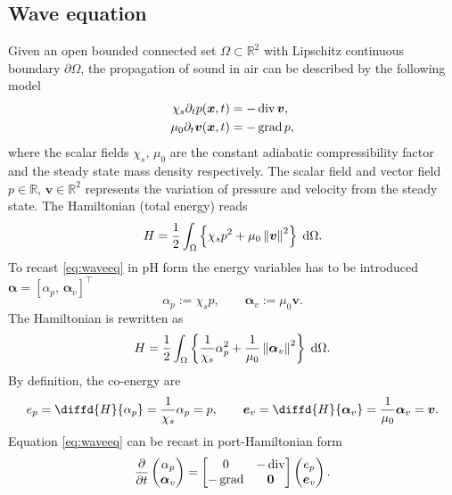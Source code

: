 \subsection{Wave equation}\label{sec:waveeq}

Given an open bounded connected set $\Omega \subset \mathbb{R}^2$ with Lipschitz continuous boundary $\partial\Omega$, the propagation of sound in air can be described by the following model \cite{trenchant2018}
\begin{equation}\label{eq:waveeq}
\begin{aligned}
\chi_s \partial_{t} p(\bm{x}, t) &=-\operatorname{div} \bm{v}, \\
\mu_0 \partial_{t} \bm{v}(\bm{x}, t) &= -\operatorname*{grad} p, \\
\end{aligned}
\end{equation}
where the scalar fields $\chi_s, \, \mu_0$ are the constant adiabatic compressibility factor and the steady state mass density respectively. The scalar field and vector field $p \in \mathbb{R}, \, \bm{v} \in \mathbb{R}^2$ represents the variation of pressure and velocity from the steady state. The Hamiltonian (total energy) reads
\begin{equation*}
H = \frac{1}{2} \int_{\Omega} \left\{\chi_s p^2 + {\mu_0}\norm{\bm{v}}^2 \right\} \d\Omega.
\end{equation*}
To recast \eqref{eq:waveeq} in pH form the energy variables has to be introduced $\bm{\alpha} = [\alpha_p, \, \bm{\alpha}_v]^\top$
\begin{equation*}
\alpha_p := \chi_s p, \qquad \bm{\alpha}_v := \mu_0 \bm{v}.
\end{equation*} 
The Hamiltonian is rewritten as
\begin{equation*}
H = \frac{1}{2} \int_{\Omega} \left\{\frac{1}{\chi_s}\alpha_p^2 + \frac{1}{\mu_0} \norm{\bm{\alpha}_v}^2 \right\} \d\Omega.
\end{equation*}
By definition, the co-energy are 
\begin{equation*}
e_p = \diffd{H}{\alpha_p} = \frac{1}{\chi_s}\alpha_p = p, \qquad \bm{e}_v = \diffd{H}{\bm{\alpha}_v} = \frac{1}{\mu_0} \bm{\alpha}_v = \bm{v}.
\end{equation*}
Equation \eqref{eq:waveeq} can be recast in port-Hamiltonian form
\begin{equation*}
\diffp{}{t}
\begin{pmatrix}
\alpha_p \\
\bm{\alpha}_v \\
\end{pmatrix} = 
\begin{bmatrix}
0 & -\div \\
-\grad & \bm{0}
\end{bmatrix}
\begin{pmatrix}
e_p \\
\bm{e}_v \\
\end{pmatrix}.
\end{equation*}
